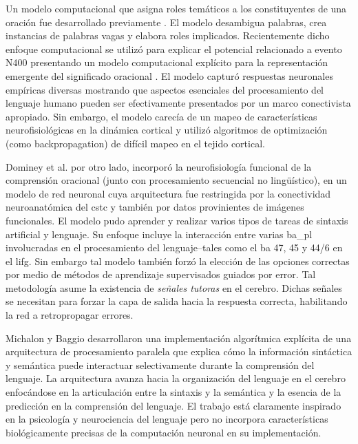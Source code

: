 {Un modelo computacional que asigna roles temáticos a los constituyentes de una oración fue desarrollado previamente \cite{STJOHN1990217}.
El modelo desambigua palabras, crea instancias de palabras vagas y elabora roles implicados.
Recientemente dicho enfoque computacional se utilizó para explicar el potencial relacionado a evento N400 presentando un modelo computacional explícito para la representación emergente del significado oracional \cite{rabovsky_modelling_2018}.
El modelo capturó respuestas neuronales empíricas diversas mostrando que aspectos esenciales del procesamiento del lenguaje humano pueden ser efectivamente presentados por un marco conectivista apropiado.
Sin embargo, el modelo carecía de un mapeo de características neurofisiológicas en la dinámica cortical y utilizó algoritmos de optimización (como backpropagation) de difícil mapeo en el tejido cortical.

Dominey et al. \cite{Dominey2009NeuralNP} por otro lado, incorporó la neurofisiología funcional de la comprensión oracional (junto con procesamiento secuencial no lingüístico), en un modelo de red neuronal cuya arquitectura fue restringida por la conectividad neuroanatómica del \gls{cstc} y también por datos provinientes de imágenes funcionales. 
El modelo pudo aprender y realizar varios tipos de tareas de sintaxis artificial y lenguaje.
Su enfoque incluye la interacción entre varias \gls{ba_pl} involucradas en el procesamiento del lenguaje--tales como el \gls{ba} 47, 45 y 44/6 en el \gls{lifg}.
Sin embargo tal modelo también forzó la elección de las opciones correctas por medio de métodos de aprendizaje supervisados guiados por error.
Tal metodología asume la existencia de \emph{señales tutoras} en el cerebro. Dichas señales se necesitan para forzar la capa de salida hacia la respuesta correcta, habilitando la red a retropropagar errores.

Michalon y Baggio \cite{michalon_meaning-driven_2019} desarrollaron una implementación algorítmica explícita de una arquitectura de procesamiento paralela que explica cómo la información sintáctica y semántica puede interactuar selectivamente durante la comprensión del lenguaje.
La arquitectura avanza hacia la organización del lenguaje en el cerebro enfocándose en la articulación entre la sintaxis y la semántica y la esencia de la predicción en la comprensión del lenguaje.
El trabajo está claramente inspirado en la psicología y neurociencia del lenguaje pero no incorpora características biológicamente precisas de la computación neuronal en su implementación.

}
